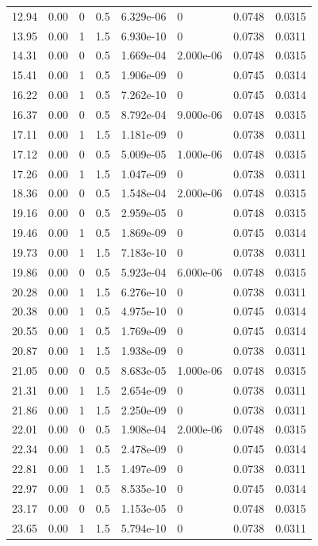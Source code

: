 \documentclass[preview]{standalone}
\begin{document}
{{\begin{tabular}{L{1.2cm}C{1.2cm} C{0.3cm}C{0.5cm} C{1.4cm}C{1.4cm} C{1.4cm}C{1.4cm}}
  12.94  &  0.00  & 0     & 0.5 &  6.329e-06  & 0  & 0.0748 &  0.0315   \\ 
  13.95  &  0.00  & 1     & 1.5 &  6.930e-10  & 0  & 0.0738 &  0.0311   \\ 
  14.31  &  0.00  & 0     & 0.5 &  1.669e-04  & 2.000e-06  & 0.0748 &  0.0315   \\ 
  15.41  &  0.00  & 1     & 0.5 &  1.906e-09  & 0  & 0.0745 &  0.0314   \\ 
  16.22  &  0.00  & 1     & 0.5 &  7.262e-10  & 0  & 0.0745 &  0.0314   \\ 
  16.37  &  0.00  & 0     & 0.5 &  8.792e-04  & 9.000e-06  & 0.0748 &  0.0315   \\ 
  17.11  &  0.00  & 1     & 1.5 &  1.181e-09  & 0  & 0.0738 &  0.0311   \\ 
  17.12  &  0.00  & 0     & 0.5 &  5.009e-05  & 1.000e-06  & 0.0748 &  0.0315   \\ 
  17.26  &  0.00  & 1     & 1.5 &  1.047e-09  & 0  & 0.0738 &  0.0311   \\ 
  18.36  &  0.00  & 0     & 0.5 &  1.548e-04  & 2.000e-06  & 0.0748 &  0.0315   \\ 
  19.16  &  0.00  & 0     & 0.5 &  2.959e-05  & 0  & 0.0748 &  0.0315   \\ 
  19.46  &  0.00  & 1     & 0.5 &  1.869e-09  & 0  & 0.0745 &  0.0314   \\ 
  19.73  &  0.00  & 1     & 1.5 &  7.183e-10  & 0  & 0.0738 &  0.0311   \\ 
  19.86  &  0.00  & 0     & 0.5 &  5.923e-04  & 6.000e-06  & 0.0748 &  0.0315   \\ 
  20.28  &  0.00  & 1     & 1.5 &  6.276e-10  & 0  & 0.0738 &  0.0311   \\ 
  20.38  &  0.00  & 1     & 0.5 &  4.975e-10  & 0  & 0.0745 &  0.0314   \\ 
  20.55  &  0.00  & 1     & 0.5 &  1.769e-09  & 0  & 0.0745 &  0.0314   \\ 
  20.87  &  0.00  & 1     & 1.5 &  1.938e-09  & 0  & 0.0738 &  0.0311   \\ 
  21.05  &  0.00  & 0     & 0.5 &  8.683e-05  & 1.000e-06  & 0.0748 &  0.0315   \\ 
  21.31  &  0.00  & 1     & 1.5 &  2.654e-09  & 0  & 0.0738 &  0.0311   \\ 
  21.86  &  0.00  & 1     & 1.5 &  2.250e-09  & 0  & 0.0738 &  0.0311   \\ 
  22.01  &  0.00  & 0     & 0.5 &  1.908e-04  & 2.000e-06  & 0.0748 &  0.0315   \\ 
  22.34  &  0.00  & 1     & 0.5 &  2.478e-09  & 0  & 0.0745 &  0.0314   \\ 
  22.81  &  0.00  & 1     & 1.5 &  1.497e-09  & 0  & 0.0738 &  0.0311   \\ 
  22.97  &  0.00  & 1     & 0.5 &  8.535e-10  & 0  & 0.0745 &  0.0314   \\ 
  23.17  &  0.00  & 0     & 0.5 &  1.153e-05  & 0  & 0.0748 &  0.0315   \\ 
  23.65  &  0.00  & 1     & 1.5 &  5.794e-10  & 0  & 0.0738 &  0.0311   \\ 
\hline 
\end{tabular} 

}}
\end{document}
